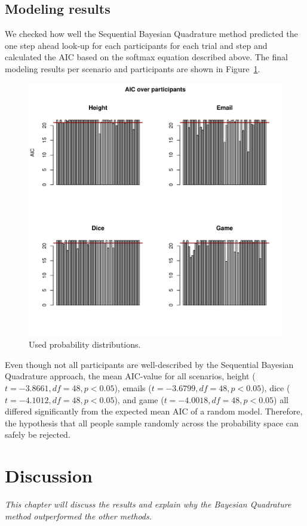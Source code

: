 \documentclass[oneside, 11pt]{book}
\begin{document}
\section{Modeling results}
We checked how well the Sequential Bayesian Quadrature method predicted the one step ahead look-up for each participants for each trial and step and calculated the AIC based on the softmax equation described above. The final modeling results per scenario and participants are shown in Figure~\ref{aic}.
\begin{figure}[h!]
\caption{Used probability distributions.}
\label{aic}
  \centering
    \includegraphics[scale=0.68]{aicbars.pdf}
\end{figure}
Even though not all participants are well-described by the Sequential Bayesian Quadrature approach, the mean AIC-value for all scenarios, height ($t = -3.8661, df = 48, p<0.05$), emails ($t = -3.6799, df = 48, p<0.05$), dice ($t = -4.1012, df = 48, p<0.05$), and game ($t = -4.0018, df = 48, p<0.05$) all differed significantly from the expected mean AIC of a random model. Therefore, the hypothesis that all people sample randomly across the probability space can safely be rejected.
\chapter{Discussion}
\emph{This chapter will discuss the results and explain why the Bayesian Quadrature method outperformed the other methods.}
\end{document}
